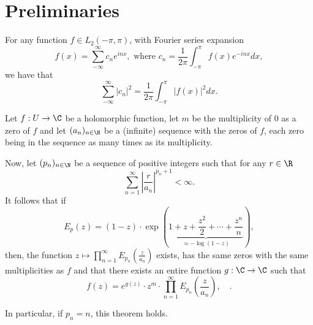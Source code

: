 
\section{Preliminaries}

\begin{theorem}
    For any function $f\in L_2(-\pi, \pi)$, with Fourier series expansion
    \[ f(x) = \sum_{-\infty}^{\infty} c_n e^{inx},\mbox{ where }c_n = \frac{1}{2\pi} \int_{-\pi}^\pi f(x) e^{-inx} dx, \]
    we have that
    \[ \sum_{-\infty}^{\infty} |c_n|^2 = \frac{1}{2\pi} \int_{-\pi}^\pi |f(x)|^2 dx .\]
\end{theorem}

\begin{theorem}
    Let $f: U \to \C$ be a holomorphic function, let $m$ be the multiplicity of 0 as a zero of $f$ and let $(a_n)_{n\in \N}$ be a (infinite) sequence with the zeros of $f$, each zero being in the sequence as many times as its multiplicity.

    Now, let $(p_n)_{n\in\N}$ be a sequence of positive integers such that for any $r \in \R$
    \[ \sum_{n = 1}^\infty \left| \frac{r}{a_n} \right|^{p_n + 1} < \infty. \]
    It follows that if
    \[ E_{p}(z) = (1-z)\cdot \exp\left( \underbrace{1+z+\frac{z^2}{2}+\cdots+\frac{z^n}{n}}_{\approx - \log (1-z)} \right), \] 
    then, the function $z \mapsto \prod_{n = 1}^{\infty} E_{p_n}\left( \frac{z}{a_n} \right)$ exists, has the same zeros with the same multiplicities as $f$ and that there exists an entire function $g: \C \to \C$ such that
    \[ f(z) = e^{g(z)} \cdot z^m \cdot \prod_{n = 1}^{\infty} E_{p_n}\left( \frac{z}{a_n} \right),\quad . \]

    In particular, if $p_n = n$, this theorem holds.
\end{theorem}
